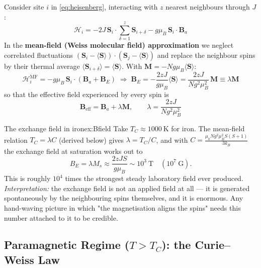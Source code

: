 \documentclass[11pt,a4paper]{article}
\newcommand{\vb}[1]{\mathbf{#1}}
\begin{document}
Consider site $i$ in \eqref{eq:heisenberg}, interacting with $z$ nearest neighbours through $J$:
\begin{equation}
    \mathcal{H}_i = -2J\,\vb{S}_i\cdot\sum_{\delta=1}^{z}\vb{S}_{i+\delta} - g\mu_B\,\vb{S}_i\cdot\vb{B}_a
    \label{eq:siteH}
\end{equation}
In the \textbf{mean-field (Weiss molecular field) approximation} we neglect correlated fluctuations $(\vb{S}_i-\langle\vb{S}\rangle)\cdot(\vb{S}_j-\langle\vb{S}\rangle)$ and replace the neighbour spins by their thermal average $\langle\vb{S}_{i+\delta}\rangle = \langle\vb{S}\rangle$. With $\vb{M} = -Ng\mu_B\langle\vb{S}\rangle$:
\begin{equation}
    \mathcal{H}_i^{\mathrm{MF}} = -g\mu_B\,\vb{S}_i\cdot\left(\vb{B}_a + \vb{B}_E\right)
    \;\Longrightarrow\;
    \vb{B}_E = -\frac{2zJ}{g\mu_B}\langle\vb{S}\rangle
    = \frac{2zJ}{Ng^2\mu_B^2}\,\vb{M}
    \equiv \lambda\vb{M}
    \label{eq:weissfield}
\end{equation}
so that the effective field experienced by every spin is
\begin{equation}
    \boxed{\;\vb{B}_{\mathrm{eff}} = \vb{B}_a + \lambda\vb{M},
    \qquad \lambda = \frac{2zJ}{Ng^2\mu_B^2}\;}
    \label{eq:beff}
\end{equation}

\begin{examplebox}{The exchange field in iron}{ex:Bfield}
Take $T_C \approx 1000\ \mathrm{K}$ for iron. The mean-field relation $T_C = \lambda C$ (derived below) gives $\lambda = T_C/C$, and with $C = \frac{\mu_0Ng^2\mu_B^2S(S+1)}{3k_B}$ the exchange field at saturation works out to
\[
B_E = \lambda M_s \approx \frac{2zJS}{g\mu_B} \sim 10^{3}\ \mathrm{T}\quad (10^{7}\ \mathrm{G}).
\]
This is roughly $10^{4}$ times the strongest steady laboratory field ever produced. \emph{Interpretation:} the exchange field is not an applied field at all --- it is generated spontaneously by the neighbouring spins themselves, and it is enormous. Any hand-waving picture in which "the magnetisation aligns the spins" needs this number attached to it to be credible.
\end{examplebox}

\subsection{Paramagnetic Regime \texorpdfstring{($T>T_C$)}{(T > TC)}: the Curie--Weiss Law}
\end{document}

